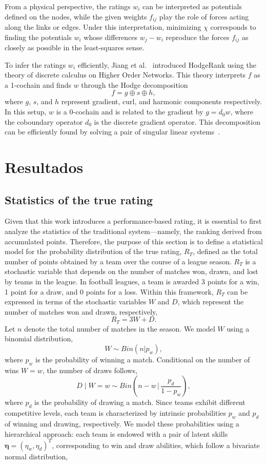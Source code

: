 \documentclass[preprint, amsmath,amssymb, pre]{revtex4-2}
\begin{document}
From a physical perspective, the ratings $w_i$ can be interpreted as potentials defined on the nodes, while the given weights $f_{ij}$ play the role of forces acting along the links or edges.
Under this interpretation, minimizing $\chi$ corresponds to finding the potentials $w_i$ whose differences $w_j-w_i$ reproduce the forces $f_{ij}$ as closely as possible in the least-squares sense.

To infer the ratings $w_i$ efficiently, Jiang et al.~\cite{jiang2011statistical} introduced HodgeRank using the theory of discrete calculus on Higher Order Networks.
This theory interprets $f$ as a 1-cochain and finds $w$ through the Hodge decomposition~\cite{grady2010discrete,lim2020hodge,bianconi2021higher}
$$
f = g \oplus s \oplus h ,
$$
where $g$, $s$, and $h$ represent gradient, curl, and harmonic components respectively.
In this setup, $w$ is a 0-cochain and is related to the gradient by $g=d_0 w$, where the coboundary operator $d_0$ is the discrete gradient operator.
This decomposition can be efficiently found by solving a pair of singular linear systems~\cite{perotti2025analysis}.


\section{Resultados}
\label{se:res}

\subsection{Statistics of the true rating}
\label{sse:rat}

Given that this work introduces a performance-based rating, it is essential to first analyze the statistics of the traditional system—namely, the ranking derived from accumulated points.
%
Therefore, the purpose of this section is to define a statistical model for the probability distribution of the true rating, $R_T$, defined as the total number of points obtained by a team over the course of a league season.
%
$R_T$ is a stochastic variable that depends on the number of matches won, drawn, and lost by teams in the league.
%
In football leagues, a team is awarded 3 points for a win, 1 point for a draw, and 0 points for a loss.
%
Within this framework, $R_T$ can be expressed in terms of the stochastic variables $W$ and $D$, which represent the number of matches won and drawn, respectively,
%
$$
R_T = 3W + D.
$$
%
Let $n$ denote the total number of matches in the season. We model $W$ using a binomial distribution,
%
$$
W \sim Bin( n | p_w ),
$$
%
where $p_w$ is the probability of winning a match. Conditional on the number of wins $W=w$, the number of draws follows,
%
$$
D \mid W=w \sim Bin\!\left( n-w \,\bigg|\, \frac{p_d}{1-p_w} \right),
$$
%
where $p_d$ is the probability of drawing a match.
%
Since teams exhibit different competitive levels, each team is characterized by intrinsic probabilities $p_w$ and $p_d$ of winning and drawing, respectively.
%
We model these probabilities using a hierarchical approach: each team is endowed with a pair of latent skills $\boldsymbol{\eta} = (\eta_w, \eta_d)^T$, corresponding to win and draw abilities, which follow a bivariate normal distribution,
\end{document}
